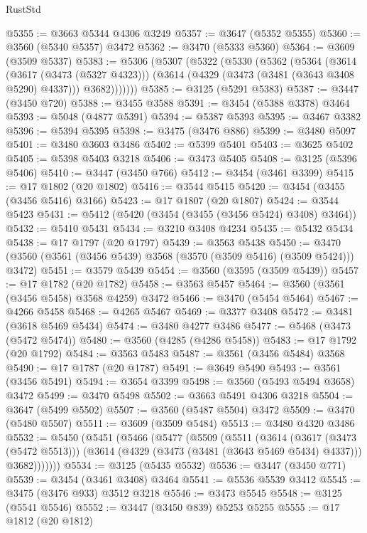 \begin{lexlean}{RustStd}
\begin{coremodule}
{\begin{coremodule}
{{{{{{{{{{{{{{{{{{{{{{{{{{{{{{{{{{{{{{{{{{{{{@5355 := @3663 @5344 @4306 @3249
@5357 := @3647 (@5352 @5355)
@5360 := @3560 (@5340 @5357) @3472
@5362 := @3470 (@5333 @5360)
@5364 := @3609 (@3509 @5337)
@5383 := @5306
    (@5307
      (@5322
        (@5330
          (@5362
            (@5364
              (@3614
                (@3617 (@3473 (@5327 @4323)))
                (@3614 (@4329 (@3473 (@3481 (@3643 @3408 @5290) @4337))) @3682)))))))
@5385 := @3125 (@5291 @5383)
@5387 := @3447 (@3450 @720)
@5388 := @3455 @3588
@5391 := @3454 (@5388 @3378) @3464
@5393 := @5048 (@4877 @5391)
@5394 := @5387 @5393
@5395 := @3467 @3382
@5396 := @5394 @5395
@5398 := @3475 (@3476 @886)
@5399 := @3480 @5097
@5401 := @3480 @3603 @3486
@5402 := @5399 @5401
@5403 := @3625 @5402
@5405 := @5398 @5403 @3218
@5406 := @3473 @5405
@5408 := @3125 (@5396 @5406)
@5410 := @3447 (@3450 @766)
@5412 := @3454 (@3461 @3399)
@5415 := @17 @1802 (@20 @1802)
@5416 := @3544 @5415
@5420 := @3454 (@3455 (@3456 @5416) @3166)
@5423 := @17 @1807 (@20 @1807)
@5424 := @3544 @5423
@5431 := @5412 (@5420 (@3454 (@3455 (@3456 @5424) @3408) @3464))
@5432 := @5410 @5431
@5434 := @3210 @3408 @4234
@5435 := @5432 @5434
@5438 := @17 @1797 (@20 @1797)
@5439 := @3563 @5438
@5450 := @3470 (@3560 (@3561 (@3456 @5439) @3568 (@3570 (@3509 @5416) (@3509 @5424))) @3472)
@5451 := @3579 @5439
@5454 := @3560 (@3595 (@3509 @5439))
@5457 := @17 @1782 (@20 @1782)
@5458 := @3563 @5457
@5464 := @3560 (@3561 (@3456 @5458) @3568 @4259) @3472
@5466 := @3470 (@5454 @5464)
@5467 := @4266 @5458
@5468 := @4265 @5467
@5469 := @3377 @3408
@5472 := @3481 (@3618 @5469 @5434)
@5474 := @3480 @4277 @3486
@5477 := @5468 (@3473 (@5472 @5474))
@5480 := @3560 (@4285 (@4286 @5458))
@5483 := @17 @1792 (@20 @1792)
@5484 := @3563 @5483
@5487 := @3561 (@3456 @5484) @3568
@5490 := @17 @1787 (@20 @1787)
@5491 := @3649 @5490
@5493 := @3561 (@3456 @5491)
@5494 := @3654 @3399
@5498 := @3560 (@5493 @5494 @3658) @3472
@5499 := @3470 @5498
@5502 := @3663 @5491 @4306 @3218
@5504 := @3647 (@5499 @5502)
@5507 := @3560 (@5487 @5504) @3472
@5509 := @3470 (@5480 @5507)
@5511 := @3609 (@3509 @5484)
@5513 := @3480 @4320 @3486
@5532 := @5450
    (@5451
      (@5466
        (@5477
          (@5509
            (@5511
              (@3614
                (@3617 (@3473 (@5472 @5513)))
                (@3614 (@4329 (@3473 (@3481 (@3643 @5469 @5434) @4337))) @3682)))))))
@5534 := @3125 (@5435 @5532)
@5536 := @3447 (@3450 @771)
@5539 := @3454 (@3461 @3408) @3464
@5541 := @5536 @5539 @3412
@5545 := @3475 (@3476 @933) @3512 @3218
@5546 := @3473 @5545
@5548 := @3125 (@5541 @5546)
@5552 := @3447 (@3450 @839) @5253 @5255
@5555 := @17 @1812 (@20 @1812)
}}}}}}}}}}}}}}}}}}}}}}}}}}}}}}}}}}}}}}}}}}}}}
\end{coremodule}}
\end{coremodule}
\end{lexlean}
